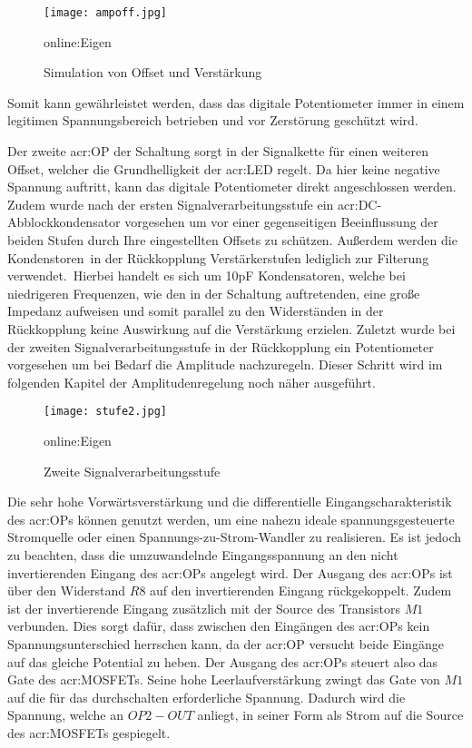 \begin{figure}[h]
	\centering
	\texttt{[image: ampoff.jpg]}
	\caption[Simulation von Offset und Verstärkung]{Simulation von Offset und Verstärkung} \gls{online:Eigen}
	\label{fig:ampoff}
\end{figure}

Somit kann gewährleistet werden, dass das digitale Potentiometer immer in einem legitimen Spannungsbereich betrieben und vor Zerstörung geschützt wird.

Der zweite \gls{acr:OP} der Schaltung sorgt in der Signalkette für einen weiteren Offset, welcher die Grundhelligkeit der \gls{acr:LED} regelt. Da hier keine negative Spannung auftritt, kann das digitale Potentiometer direkt angeschlossen werden. Zudem wurde nach der ersten Signalverarbeitungsstufe ein \gls{acr:DC}-Abblockkondensator vorgesehen um vor einer gegenseitigen Beeinflussung der beiden Stufen durch Ihre eingestellten Offsets zu schützen. Außerdem werden die Kondenstoren in der Rückkopplung Verstärkerstufen lediglich zur Filterung verwendet. Hierbei handelt es sich um 10pF Kondensatoren, welche bei niedrigeren Frequenzen, wie den in der Schaltung auftretenden, eine große Impedanz aufweisen und somit parallel zu den Widerständen in der Rückkopplung keine Auswirkung auf die Verstärkung erzielen. Zuletzt wurde bei der zweiten Signalverarbeitungsstufe in der Rückkopplung ein Potentiometer vorgesehen um bei Bedarf die Amplitude nachzuregeln. Dieser Schritt wird im folgenden Kapitel der Amplitudenregelung noch näher ausgeführt. 

\begin{figure}[h]
	\centering
	\texttt{[image: stufe2.jpg]}
	\caption[Zweite Signalverarbeitungsstufe]{Zweite Signalverarbeitungsstufe} \gls{online:Eigen}
	\label{fig:stufe2}
\end{figure}
 

Die sehr hohe Vorwärtsverstärkung und die differentielle Eingangscharakteristik des \gls{acr:OP}s können genutzt werden, um eine nahezu ideale spannungsgesteuerte Stromquelle oder einen Spannungs-zu-Strom-Wandler zu realisieren. Es ist jedoch zu beachten, dass die umzuwandelnde Eingangsspannung an den nicht invertierenden Eingang des \gls{acr:OP}s angelegt wird. Der Ausgang des \gls{acr:OP}s ist über den Widerstand $R{8}$ auf den invertierenden Eingang rückgekoppelt. Zudem ist der invertierende Eingang zusätzlich mit der Source des Transistors $M{1}$ verbunden. Dies sorgt dafür, dass zwischen den Eingängen des \gls{acr:OP}s kein Spannungsunterschied herrschen kann, da der \gls{acr:OP} versucht beide Eingänge auf das gleiche Potential zu heben. Der Ausgang des \gls{acr:OP}s steuert also das Gate des \gls{acr:MOSFET}s. Seine hohe Leerlaufverstärkung zwingt das Gate von $M{1}$ auf die für das durchschalten erforderliche Spannung. Dadurch wird die Spannung, welche an $OP2-OUT$ anliegt, in seiner Form als Strom auf die Source des \gls{acr:MOSFET}s gespiegelt.

